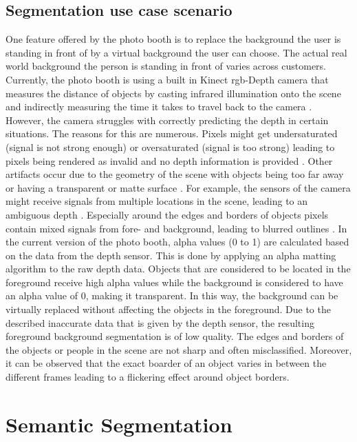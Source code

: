 \documentclass[11pt,
  paper=a4, 
  bibliography=totocnumbered,
	captions=tableheading,
	BCOR=10mm
]{scrreprt}
\theoremstyle{definition}
\begin{document}
\subsection{Segmentation use case scenario}\label{sec:Usecase}
One feature offered by the photo booth is to replace the background the user is standing in front of by a virtual background the user can choose.
The actual real world background the person is standing in front of varies across customers.
Currently, the photo booth is using a built in Kinect \gls{rgb}-Depth camera that measures the distance of objects by casting infrared illumination onto the scene and indirectly measuring the time it takes to travel back to the camera \cite{Cruz2012}. 
However, the camera struggles with correctly predicting the depth in certain situations. 
The reasons for this are numerous. 
Pixels might get undersaturated (signal is not strong enough) or oversaturated (signal is too strong) leading to pixels being rendered as invalid and no depth information is provided \cite{Microsoft2019}.
Other artifacts occur due to the geometry of the scene with objects being too far away or having a transparent or matte surface \cite{Kim2014}. 
For example, the sensors of the camera might receive signals from multiple locations in the scene, leading to an ambiguous depth \cite{Microsoft2019}. 
Especially around the edges and borders of objects pixels contain mixed signals from fore- and background, leading to blurred outlines \cite{Kim2013}.
In the current version of the photo booth, alpha values (0 to 1) are calculated based on the data from the depth sensor. 
This is done by applying an alpha matting algorithm \cite{Gastal2010} to the raw depth data.
Objects that are considered to be located in the foreground receive high alpha values while the background is considered to have an alpha value of 0, making it transparent. 
In this way, the background can be virtually replaced without affecting the objects in the foreground. 
Due to the described inaccurate data that is given by the depth sensor, the resulting foreground background segmentation is of low quality. 
The edges and borders of the objects or people in the scene are not sharp and often misclassified. 
Moreover, it can be observed that the exact boarder of an object varies in between the different frames leading to a flickering effect around object borders.


\section{Semantic Segmentation}
\end{document}
